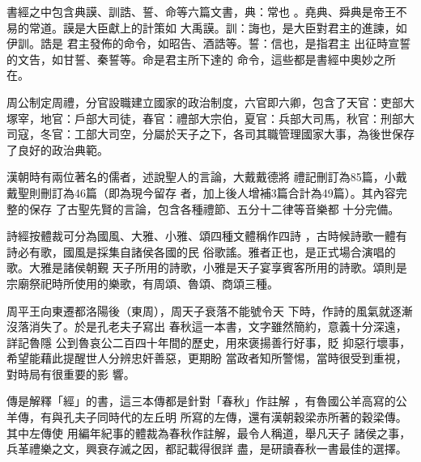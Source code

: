 \documentclass[avery5371,grid]{flashcards}
\begin{document}
{書經之中包含典謨、訓誥、誓、命等六篇文書，典：常也
。堯典、舜典是帝王不易的常道。謨是大臣獻上的計策如
大禹謨。訓：誨也，是大臣對君主的進諫，如伊訓。誥是
君主發佈的命令，如昭告、酒誥等。誓：信也，是指君主
出征時宣誓的文告，如甘誓、秦誓等。命是君主所下達的
命令，這些都是書經中奧妙之所在。} %
{} %

{周公制定周禮，分官設職建立國家的政治制度，六官即六卿，包含了天官：吏部大塚宰，地官：戶部大司徒，春官：禮部大宗伯，夏官：兵部大司馬，秋官：刑部大司寇，冬官：工部大司空，分屬於天子之下，各司其職管理國家大事，為後世保存了良好的政治典範。} %
{} %

{漢朝時有兩位著名的儒者，述說聖人的言論，大戴戴德將
禮記刪訂為85篇，小戴戴聖則刪訂為46篇（即為現今留存
者，加上後人增補3篇合計為49篇）。其內容完整的保存
了古聖先賢的言論，包含各種禮節、五分十二律等音樂都
十分完備。} %
{} %

{詩經按體裁可分為國風、大雅、小雅、頌四種文體稱作四詩
，古時候詩歌一體有詩必有歌，國風是採集自諸侯各國的民
俗歌謠。雅者正也，是正式場合演唱的歌。大雅是諸侯朝覲
天子所用的詩歌，小雅是天子宴享賓客所用的詩歌。頌則是
宗廟祭祀時所使用的樂歌，有周頌、魯頌、商頌三種。} %
{} %

{周平王向東遷都洛陽後（東周），周天子衰落不能號令天
下時，作詩的風氣就逐漸沒落消失了。於是孔老夫子寫出
春秋這一本書，文字雖然簡約，意義十分深遠，詳記魯隱
公到魯哀公二百四十年間的歷史，用來褒揚善行好事，貶
抑惡行壞事，希望能藉此提醒世人分辨忠奸善惡，更期盼
當政者知所警惕，當時很受到重視，對時局有很重要的影
響。} %
{} %

{傳是解釋「經」的書，這三本傳都是針對「春秋」作註解
，有魯國公羊高寫的公羊傳，有與孔夫子同時代的左丘明
所寫的左傳，還有漢朝穀梁赤所著的穀梁傳。其中左傳使
用編年紀事的體裁為春秋作註解，最令人稱道，舉凡天子
諸侯之事，兵革禮樂之文，興衰存滅之因，都記載得很詳
盡，是研讀春秋一書最佳的選擇。} %
{} %
\end{document}
